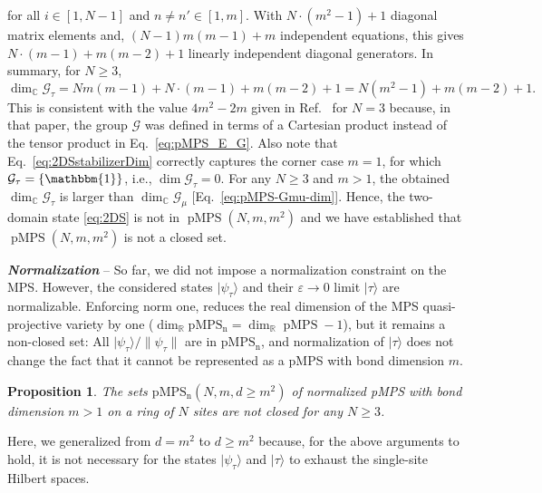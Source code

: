 \documentclass[english,11pt,aps,pra,onecolumn,tightenlines,groupedaddress,superscriptaddress,notitlepage,floatfix,fleqn]{revtex4-1}
\newcommand{\id}{\mathbbm{1}}
\newcommand{\ket}{\rangle}
\newcommand{\RR}{\mathbb{R}}
\newcommand{\CC}{\mathbb{C}}
\newcommand{\mc}[1]{\mathcal{#1}}
\newcommand{\G}{\mc{G}}
\newcommand{\pMPS}{\operatorname{pMPS}}
\newcommand{\pMPSn}{\operatorname{pMPS_n}}
\newcommand{\veps}{\varepsilon}
\newcommand{\Emph}[1]{\textbf{\emph{#1}}}
\newtheorem{prop}{Proposition}
\begin{document}
for all $i\in[1,N-1]$ and $n\neq n'\in[1,m]$. With $N\cdot(m^2-1)+1$ diagonal matrix elements and, $(N-1)m(m-1)+m$ independent equations, this gives $N\cdot(m-1)+m(m-2)+1$ linearly independent diagonal generators. In summary, for $N\geq 3$,
\begin{equation}\label{eq:2DSstabilizerDim}
	\dim_\CC \G_\tau = Nm(m-1) + N\cdot(m-1)+m(m-2)+1 =  N(m^2-1)+m(m-2)+1.
\end{equation}
This is consistent with the value $4m^2-2m$ given in Ref.~\cite{Landsberg2012-12} for $N=3$ because, in that paper, the group $\G$ was defined in terms of a Cartesian product instead of the tensor product in Eq.~\eqref{eq:pMPS_E_G}. Also note that Eq.~\eqref{eq:2DSstabilizerDim} correctly captures the corner case $m=1$, for which $\G_\tau=\{\id\}$, i.e., $\dim\G_\tau=0$. 
For any $N\geq 3$ and $m>1$, the obtained $\dim_\CC \G_\tau$ is larger than $\dim_\CC \G_{\mu}$ [Eq.~\eqref{eq:pMPS-Gmu-dim}]. Hence, the two-domain state \eqref{eq:2DS} is not in $\pMPS(N,m,m^2)$ and we have established that $\pMPS(N,m,m^2)$ is not a closed set.

\Emph{Normalization} -- 
So far, we did not impose a normalization constraint on the MPS. However, the considered states $|\psi_\tau\ket$ and their $\veps\to 0$ limit $|\tau\ket$ are normalizable. Enforcing norm one, reduces the real dimension of the MPS quasi-projective variety by one ($\dim_\RR \pMPSn=\dim_\RR \pMPS -1$), but it remains a non-closed set: All $|\psi_\tau\ket/\|\psi_\tau\|$ are in $\pMPSn$, and normalization of $|\tau\ket$ does not change the fact that it cannot be represented as a pMPS with bond dimension $m$.
\begin{prop}\label{prop:pMPSsmall}
The sets $\pMPSn(N,m,d\geq m^2)$ of normalized pMPS with bond dimension $m>1$ on a ring of $N$ sites are not closed for any $N\geq 3$.
\end{prop}
Here, we generalized from $d=m^2$ to $d\geq m^2$ because, for the above arguments to hold, it is not necessary for the states $|\psi_\tau\ket$ and $|\tau\ket$ to exhaust the single-site Hilbert spaces.
\end{document}
